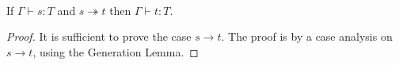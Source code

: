 {\begin{code}
\>  \AgdaSymbol{:}  \AgdaSymbol{\{}\AgdaSymbol{\}} \AgdaSymbol{\{} \AgdaSymbol{:}  \AgdaSymbol{\}} \AgdaSymbol{\{}     \AgdaSymbol{\}}  \<[56]%
\>[56]\<%
\\
\>[0]\<[18]%
\>[18]     \AgdaSymbol{(}  \AgdaSymbol{)}               \AgdaFunction{⋆[}      \AgdaFunction{]}          \<%
\end{code}
}

\begin{theorem}
If $\Gamma \vdash s : T$ and $s \twoheadrightarrow t$ then $\Gamma \vdash t : T$.
\end{theorem}

\begin{proof}
It is sufficient to prove the case $s \rightarrow t$.  The proof is by a case analysis on $s \rightarrow t$, using the Generation Lemma.
\end{proof}


